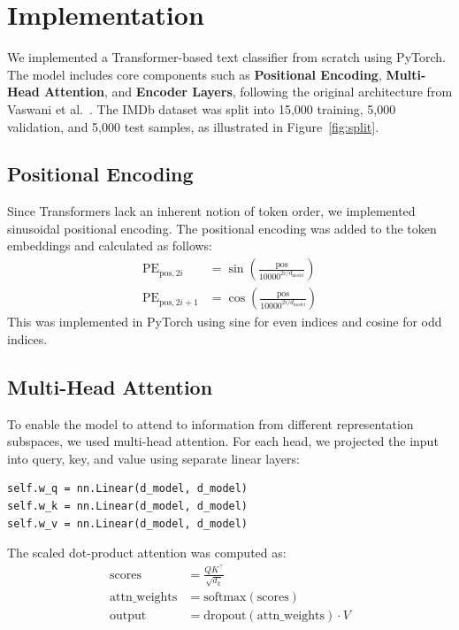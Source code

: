 \section{Implementation}
\label{sec:implementation}

We implemented a Transformer-based text classifier from scratch using PyTorch. The model includes core components such as \textbf{Positional Encoding}, \textbf{Multi-Head Attention}, and \textbf{Encoder Layers}, following the original architecture from Vaswani et al.~\cite{vaswani2017attention}. The IMDb dataset was split into 15,000 training, 5,000 validation, and 5,000 test samples, as illustrated in Figure~\ref{fig:split}.

\subsection{Positional Encoding}

Since Transformers lack an inherent notion of token order, we implemented sinusoidal positional encoding. The positional encoding was added to the token embeddings and calculated as follows:
\begin{align}
\text{PE}_{\text{pos}, 2i} &= \sin\left(\frac{\text{pos}}{10000^{2i/d_{\text{model}}}}\right) \\
\text{PE}_{\text{pos}, 2i+1} &= \cos\left(\frac{\text{pos}}{10000^{2i/d_{\text{model}}}}\right)
\end{align}
This was implemented in PyTorch using sine for even indices and cosine for odd indices.

\subsection{Multi-Head Attention}

To enable the model to attend to information from different representation subspaces, we used multi-head attention. For each head, we projected the input into query, key, and value using separate linear layers:
\begin{verbatim}
self.w_q = nn.Linear(d_model, d_model)
self.w_k = nn.Linear(d_model, d_model)
self.w_v = nn.Linear(d_model, d_model)
\end{verbatim}
The scaled dot-product attention was computed as:
\begin{align}
\text{scores} &= \frac{QK^\top}{\sqrt{d_k}} \\
\text{attn\_weights} &= \text{softmax}(\text{scores}) \\
\text{output} &= \text{dropout}(\text{attn\_weights}) \cdot V
\end{align}


